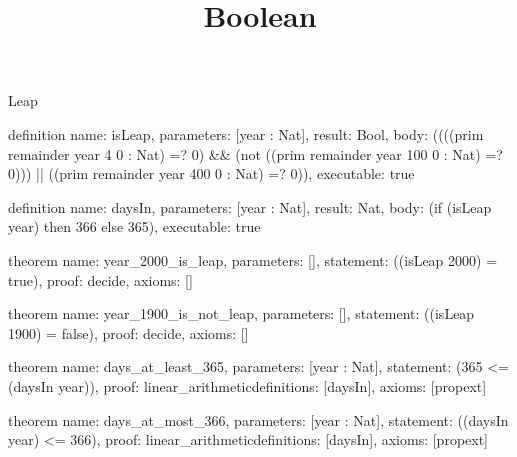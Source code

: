 \begin{lexlean}{Leap}
\title{Boolean}
\begin{semanticmodule}
definition{
  name: isLeap,
  parameters: [year : Nat],
  result: Bool,
  body: ((((prim remainder year 4 0 : Nat) =? 0) && (not ((prim remainder year 100 0 : Nat) =? 0))) || ((prim remainder year 400 0 : Nat) =? 0)),
  executable: true
}

definition{
  name: daysIn,
  parameters: [year : Nat],
  result: Nat,
  body: (if (isLeap year) then 366 else 365),
  executable: true
}

theorem{
  name: year_2000_is_leap,
  parameters: [],
  statement: ((isLeap 2000) = true),
  proof: decide{},
  axioms: []
}

theorem{
  name: year_1900_is_not_leap,
  parameters: [],
  statement: ((isLeap 1900) = false),
  proof: decide{},
  axioms: []
}

theorem{
  name: days_at_least_365,
  parameters: [year : Nat],
  statement: (365 <= (daysIn year)),
  proof: linear_arithmetic{definitions: [daysIn]},
  axioms: [propext]
}

theorem{
  name: days_at_most_366,
  parameters: [year : Nat],
  statement: ((daysIn year) <= 366),
  proof: linear_arithmetic{definitions: [daysIn]},
  axioms: [propext]
}
\end{semanticmodule}
\end{lexlean}
